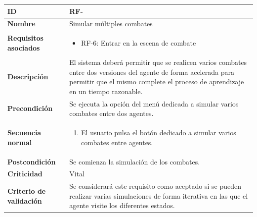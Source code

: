 \begin{center}
	\begin{tabular}{ | p{4.7cm} | p{10cm} | } 
		\hline
		
		\textbf{ID} & RF-\arabic{contador_requisitos_funcionales}
		{contador_requisitos_funcionales} \\
		
		\hline 
		\textbf{Nombre} &
		Simular múltiples combates\\ 
		
		\hline
		\textbf{Requisitos asociados} & 
		\begin{itemize}
			\item RF-6: Entrar en la escena de combate
		\end{itemize}\\
		
		\hline
		\textbf{Descripción} & 
		El sistema deberá permitir que se realicen varios combates entre dos versiones del agente de forma acelerada para permitir que el mismo complete el proceso de aprendizaje en un tiempo razonable.\\
		
		\hline
		\textbf{Precondición} & 
		Se ejecuta la opción del menú dedicada a simular varios combates entre dos agentes.\\
		
		\hline
		\textbf{Secuencia normal} &
		\begin{enumerate}
			\item El usuario pulsa el botón dedicado a simular varios combates entre agentes.
		\end{enumerate}
		\\
		
		\hline
		\textbf{Postcondición} & 
		Se comienza la simulación de los combates.\\
		
		\hline 
		\textbf{Criticidad} &
		Vital\\
		
		\hline 
		\textbf{Criterio de validación} & 
		Se considerará este requisito como aceptado si se pueden realizar varias simulaciones de forma iterativa en las que el agente visite los diferentes estados.\\
		
		\hline
	\end{tabular}
\end{center}

